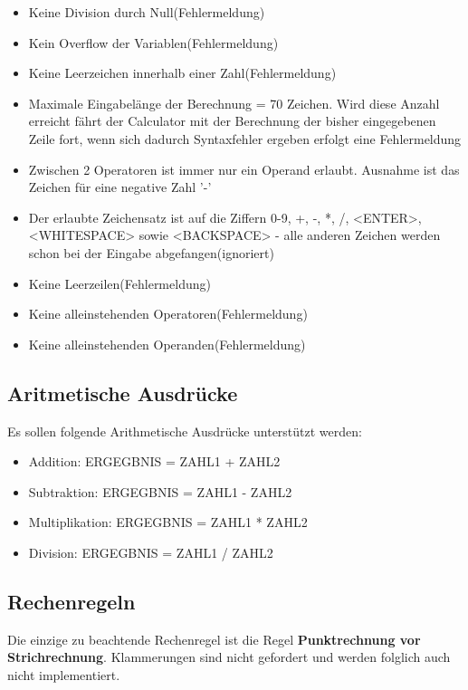 \begin{itemize}

\item Keine Division durch Null(Fehlermeldung)
\item Kein Overflow der Variablen(Fehlermeldung)
\item Keine Leerzeichen innerhalb einer Zahl(Fehlermeldung)
\item Maximale Eingabelänge der Berechnung = 70 Zeichen. Wird diese Anzahl erreicht fährt der Calculator mit der Berechnung der bisher eingegebenen Zeile fort, wenn sich dadurch Syntaxfehler ergeben erfolgt eine Fehlermeldung
\item Zwischen 2 Operatoren ist immer nur ein Operand erlaubt. Ausnahme ist das Zeichen für eine negative Zahl '-'
\item Der erlaubte Zeichensatz ist auf die Ziffern 0-9, +, -, *, /, <ENTER>, <WHITESPACE> sowie <BACKSPACE> - alle anderen Zeichen werden schon bei der Eingabe abgefangen(ignoriert) 
\item Keine Leerzeilen(Fehlermeldung)
\item Keine alleinstehenden Operatoren(Fehlermeldung)
\item Keine alleinstehenden Operanden(Fehlermeldung)

\end{itemize}

\subsection{Aritmetische Ausdrücke}

Es sollen folgende Arithmetische Ausdrücke unterstützt werden:

\begin{itemize}

\item Addition: ERGEGBNIS = ZAHL1 + ZAHL2
\item Subtraktion: ERGEGBNIS = ZAHL1 - ZAHL2
\item Multiplikation: ERGEGBNIS = ZAHL1 * ZAHL2
\item Division: ERGEGBNIS = ZAHL1 / ZAHL2
\end{itemize}


\subsection{Rechenregeln}
Die einzige zu beachtende Rechenregel ist die Regel \textbf{Punktrechnung vor Strichrechnung}. 
Klammerungen sind nicht gefordert und werden folglich auch nicht implementiert.


